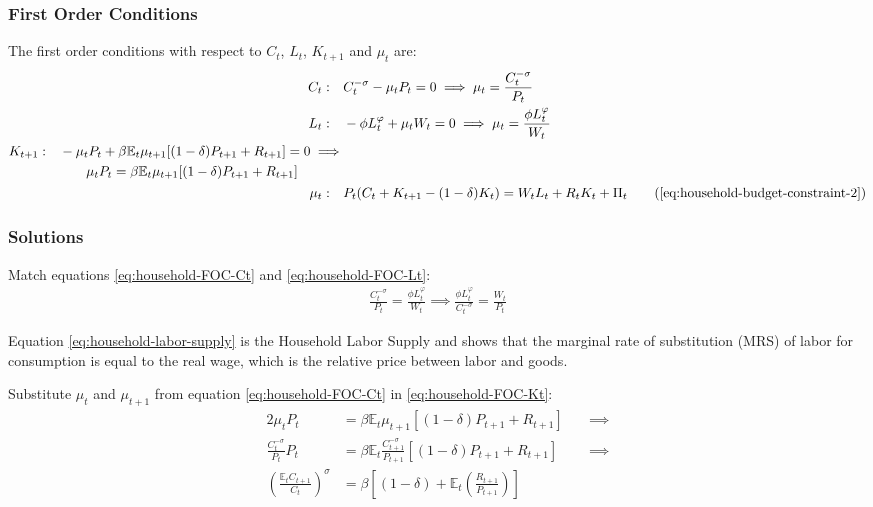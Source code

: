 \documentclass[
	12pt, 
	]{article}
\numberwithin{equation}{section}
\theoremstyle{definition}
\theoremstyle{plain}
\theoremstyle{plain}
\theoremstyle{plain}
\begin{document}
\subsubsection*{First Order Conditions}

The first order conditions with respect to $C_t$, $L_t$, $K_{t+1}$ and $\mu_t$ are:
\begin{align}
	C_t: \quad & C_t^{-\sigma} -\mu_t P_t = 0 \implies \mu_t = \frac{C_t^{-\sigma}}{P_t} \label{eq:household-FOC-Ct} \\
	L_t: \quad & -\phi L_t^{\varphi} +\mu_t W_t = 0 \implies \mu_t = \frac{\phi L_t^{\varphi}}{W_t} \label{eq:household-FOC-Lt} \\
	\begin{split}
		K_{t+1}: \quad & -\mu_t P_t +\beta \mathbb{E}_t \mu_{t+1} [(1-\delta) P_{t+1} + R_{t+1}] = 0 \implies \\ & \qquad \mu_t P_t = \beta \mathbb{E}_t \mu_{t+1} [(1-\delta) P_{t+1} + R_{t+1}]
	\end{split} \label{eq:household-FOC-Kt} \\
	\mu_t: \quad & P_t (C_t + K_{t+1} - (1-\delta)K_t) = W_t L_t + R_t K_t + \Pi_t \tag{\ref{eq:household-budget-constraint-2}}
\end{align}

\subsubsection*{Solutions}

Match equations \ref{eq:household-FOC-Ct} and \ref{eq:household-FOC-Lt}:
\begin{align}
\label{eq:household-labor-supply}
	\frac{C_t^{-\sigma}}{P_t} = \frac{\phi L_t^{\varphi}}{W_t} \implies 
	\frac{\phi L_t^{\varphi}}{C_t^{-\sigma}} = \frac{W_t}{P_t}
\end{align}

Equation \ref{eq:household-labor-supply} is the Household Labor Supply and shows that the marginal rate of substitution (MRS) of labor for consumption is equal to the real wage, which is the relative price between labor and goods.

Substitute $\mu_t$ and $\mu_{t+1}$ from equation \ref{eq:household-FOC-Ct} in \ref{eq:household-FOC-Kt}:
\begin{alignat}{2}
	\mu_t P_t & = \beta \mathbb{E}_t \mu_{t+1} [(1-\delta) P_{t+1} + R_{t+1}] \quad &\implies \nonumber \\
	\frac{C_t^{-\sigma}}{P_t} P_t & = \beta \mathbb{E}_t \frac{C_{t+1}^{-\sigma}}{P_{t+1}} [(1-\delta) P_{t+1} + R_{t+1}] &\implies \nonumber \\
	\left( \frac{\mathbb{E}_t C_{t+1}}{C_t} \right)^\sigma & = \beta \left[ (1-\delta) + \mathbb{E}_t \left(\frac{R_{t+1}}{P_{t+1}}\right) \right] \label{eq:household-euler-equation}
\end{alignat}
\end{document}
